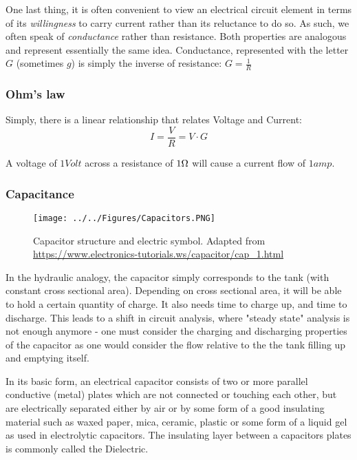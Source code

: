 One last thing, it is often convenient to view an electrical circuit element in terms of its \textit{willingness} to carry current rather than its reluctance to do so. As such, we often speak of \textit{conductance} rather than resistance. Both properties are analogous and represent essentially the same idea. Conductance, represented with the letter $G$ (sometimes $g$) is simply the inverse of resistance: $G = \frac{1}{R}$

\subsubsection{Ohm's law}

Simply, there is a linear relationship that relates Voltage and Current: 
\begin{equation}
    I = \frac{V}{R} = V\cdot G
\end{equation}

A voltage of $1 Volt$ across a resistance of $1 \ohm$ will cause a current flow of $1 amp$.

\subsubsection{Capacitance}

\begin{figure}[H]
    \centering
    \texttt{[image: ../../Figures/Capacitors.PNG]}
    \caption{Capacitor structure and electric symbol. Adapted from \url{https://www.electronics-tutorials.ws/capacitor/cap_1.html}}
    \label{fig:Capacitors}
\end{figure}

In the hydraulic analogy, the capacitor simply corresponds to the tank (with constant cross sectional area). Depending on cross sectional area, it will be able to hold a certain quantity of charge. It also needs time to charge up, and time to discharge. This leads to a shift in circuit analysis, where "steady state" analysis is not enough anymore - one must consider the charging and discharging properties of the capacitor as one would consider the flow relative to the the tank filling up and emptying itself. 

In its basic form, an electrical capacitor consists of two or more parallel conductive (metal) plates which are not connected or touching each other, but are electrically separated either by air or by some form of a good insulating material such as waxed paper, mica, ceramic, plastic or some form of a liquid gel as used in electrolytic capacitors. The insulating layer between a capacitors plates is commonly called the Dielectric.

